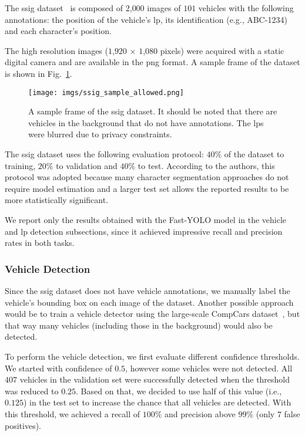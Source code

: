The \gls*{ssig} dataset~\cite{goncalves2016benchmark} is composed of $2$,$000$ images of $101$ vehicles with the following annotations: the position of the vehicle's \gls*{lp}, its identification (e.g., ABC-1234) and each character's position.

The high resolution images ($1$,$920$ $\times$ $1$,$080$ pixels) were acquired with a static digital camera and are available in the \gls*{png} format. A sample frame of the dataset is shown in Fig.~\ref{fig:ssig_sample}.

\begin{figure}[!htb]
	\centering
 	\texttt{[image: imgs/ssig\_sample\_allowed.png]}
	\caption{A sample frame of the \gls*{ssig} dataset. It should be noted that there are vehicles in the background that do not have annotations. The \glspl*{lp} were blurred due to privacy constraints.}
	\label{fig:ssig_sample}    
\end{figure}

The \gls*{ssig} dataset uses the following evaluation protocol: $40\%$ of the dataset to training, $20\%$ to validation and $40\%$ to test. According to the authors, this protocol was adopted because many character segmentation approaches do not require model estimation and a larger test set allows the reported results to be more statistically significant.

We report only the results obtained with the Fast-YOLO model in the vehicle and \gls*{lp} detection subsections, since it achieved impressive recall and precision rates in both tasks.

\subsubsection{Vehicle Detection}
Since the \gls*{ssig} dataset does not have vehicle annotations, we manually label the vehicle's bounding box on each image of the dataset. Another possible approach would be to train a vehicle detector using the large-scale CompCars dataset~\cite{yang2015}, but that way many vehicles (including those in the background) would also be detected. 

To perform the vehicle detection, we first evaluate different confidence thresholds. We started with confidence of $0.5$, however some vehicles were not detected. All $407$ vehicles in the validation set were successfully detected when the threshold was reduced to $0.25$. Based on that, we decided to use half of this value (i.e., $0.125$) in the test set to increase the chance that all vehicles are detected. With this threshold, we achieved a recall of $100\%$ and precision above $99\%$ (only $7$ false positives). 

